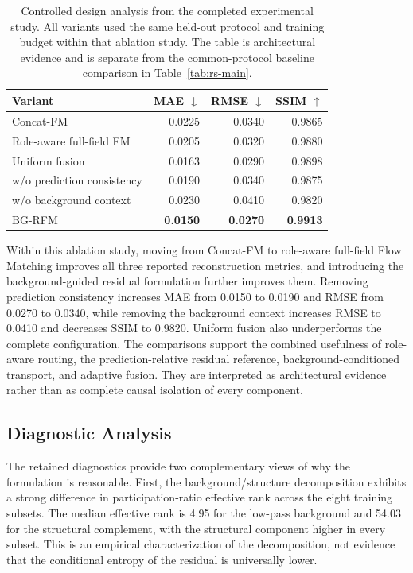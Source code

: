 \documentclass[remotesensing,article,submit,pdftex,moreauthors]{Definitions/mdpi}
\begin{document}
\begin{table}[H]
\caption{Controlled design analysis from the completed experimental study. All variants used the same held-out protocol and training budget within that ablation study. The table is architectural evidence and is separate from the common-protocol baseline comparison in Table~\ref{tab:rs-main}.\label{tab:design-ablation}}
\begin{tabularx}{\textwidth}{Xrrr}
\toprule
\textbf{Variant} & \textbf{MAE $\downarrow$} & \textbf{RMSE $\downarrow$} & \textbf{SSIM $\uparrow$} \\
\midrule
Concat-FM & 0.0225 & 0.0340 & 0.9865 \\
Role-aware full-field FM & 0.0205 & 0.0320 & 0.9880 \\
Uniform fusion & 0.0163 & 0.0290 & 0.9898 \\
w/o prediction consistency & 0.0190 & 0.0340 & 0.9875 \\
w/o background context & 0.0230 & 0.0410 & 0.9820 \\
BG-RFM & \textbf{0.0150} & \textbf{0.0270} & \textbf{0.9913} \\
\bottomrule
\end{tabularx}
\end{table}


Within this ablation study, moving from Concat-FM to role-aware full-field Flow Matching improves all three reported reconstruction metrics, and introducing the background-guided residual formulation further improves them. Removing prediction consistency increases MAE from 0.0150 to 0.0190 and RMSE from 0.0270 to 0.0340, while removing the background context increases RMSE to 0.0410 and decreases SSIM to 0.9820. Uniform fusion also underperforms the complete configuration. The comparisons support the combined usefulness of role-aware routing, the prediction-relative residual reference, background-conditioned transport, and adaptive fusion. They are interpreted as architectural evidence rather than as complete causal isolation of every component.

\subsection{Diagnostic Analysis}

The retained diagnostics provide two complementary views of why the formulation is reasonable. First, the background/structure decomposition exhibits a strong difference in participation-ratio effective rank across the eight training subsets. The median effective rank is 4.95 for the low-pass background and 54.03 for the structural complement, with the structural component higher in every subset. This is an empirical characterization of the decomposition, not evidence that the conditional entropy of the residual is universally lower.
\end{document}
